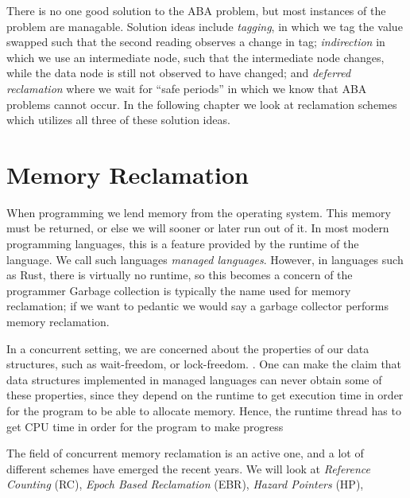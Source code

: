 \documentclass[b5paper]{report}
\begin{document}
There is no one good solution to the ABA problem, but most instances of the
problem are managable. Solution ideas include \emph{tagging}, in which we tag
the value swapped such that the second reading observes a change in tag;
\emph{indirection} in which we use an intermediate node, such that the
intermediate node changes, while the data node is still not observed to have
changed; and \emph{deferred reclamation} where we wait for ``safe periods'' in
which we know that ABA problems cannot occur. In the following chapter we look
at reclamation schemes which utilizes all three of these solution ideas.



\chapter{Memory Reclamation}  

When programming we lend memory from the operating system. This memory must be
returned, or else we will sooner or later run out of it. In most modern
programming languages, this is a feature provided by the runtime of the
language. We call such languages \emph{managed languages}. However, in
languages such as Rust, there is virtually no runtime, so this becomes a
concern of the programmer Garbage collection is typically the name used for
memory reclamation; if we want to pedantic we would say a garbage collector
performs memory reclamation.

In a concurrent setting, we are concerned about the properties of our data
structures,  such as wait-freedom, or lock-freedom.
. One can make the claim that data structures
implemented in managed languages can never obtain some of these properties,
since they depend on the runtime to get execution time in order for the program
to be able to allocate memory. Hence, the runtime thread has to get CPU time
in order for the program to make progress 

The field of concurrent memory reclamation is an active one, and a lot of
different schemes have emerged the recent years. We will look at
\emph{Reference Counting} (RC),
\emph{Epoch Based Reclamation} (EBR),
\emph{Hazard Pointers} (HP),
\end{document}
